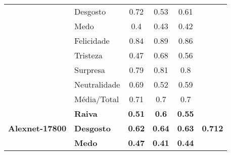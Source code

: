 \begin{table}[]
\begin{tabular}{llcccc}
                                        & Desgosto              & 0.72                                  & 0.53                                   & 0.61                                  &                                       \\
                                        & Medo                  & 0.4                                   & 0.43                                   & 0.42                                  &                                       \\
                                        & Felicidade            & 0.84                                  & 0.89                                   & 0.86                                  &                                       \\
                                        & Tristeza              & 0.47                                  & 0.68                                   & 0.56                                  &                                       \\
                                        & Surpresa              & 0.79                                  & 0.81                                   & 0.8                                   &                                       \\
                                        & Neutralidade          & 0.69                                  & 0.52                                   & 0.59                                  &                                       \\
                                        & Média/Total           & 0.71                                  & 0.7                                    & 0.7                                   &                                       \\ \hline
\multirow{8}{*}{\textbf{Alexnet-17800}} & \textbf{Raiva}        & \textbf{0.51}                         & \textbf{0.6}                           & \textbf{0.55}                         & \multirow{8}{*}{\textbf{0.712}}       \\
                                        & \textbf{Desgosto}     & \textbf{0.62}                         & \textbf{0.64}                          & \textbf{0.63}                         &                                       \\
                                        & \textbf{Medo}         & \textbf{0.47}                         & \textbf{0.41}                          & \textbf{0.44}                         &                                       \\

\end{tabular}
\end{table}
